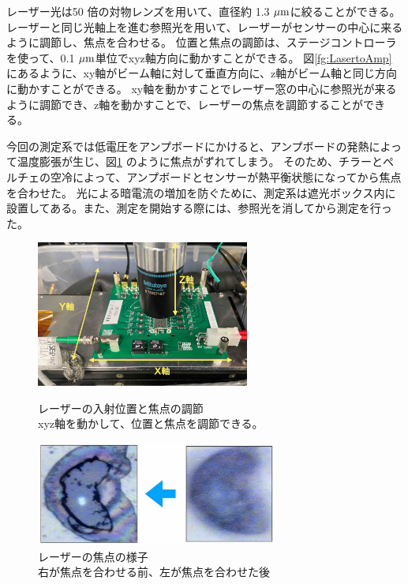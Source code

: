 レーザー光は50 倍の対物レンズを用いて、直径約 1.3 $\rm{\mu m}$に絞ることができる。
レーザーと同じ光軸上を進む参照光を用いて、レーザーがセンサーの中心に来るように調節し、焦点を合わせる。
位置と焦点の調節は、ステージコントローラを使って、0.1 $\rm{\mu m}$単位でxyz軸方向に動かすことができる。
図\ref{fg:LasertoAmp} にあるように、xy軸がビーム軸に対して垂直方向に、z軸がビーム軸と同じ方向に動かすことができる。
xy軸を動かすことでレーザー窓の中心に参照光が来るように調節でき、z軸を動かすことで、レーザーの焦点を調節することができる。

今回の測定系では低電圧をアンプボードにかけると、アンプボードの発熱によって温度膨張が生じ、図\ref{fg:Focus} のように焦点がずれてしまう。
そのため、チラーとペルチェの空冷によって、アンプボードとセンサーが熱平衡状態になってから焦点を合わせた。
光による暗電流の増加を防ぐために、測定系は遮光ボックス内に設置してある。また、測定を開始する際には、参照光を消してから測定を行った。


\begin{figure}[h]
    \begin{minipage}[b]{0.5\linewidth}
        \centering
        \includegraphics[width=7cm]{fig/ch4/LasertoAmp.jpg}
        \caption[レーザーの入射位置と焦点の調節]{レーザーの入射位置と焦点の調節\\xyz軸を動かして、位置と焦点を調節できる。}
        \label{fg:LasertoAmp}
    \end{minipage}
    \begin{minipage}[b]{0.5\linewidth}
        \centering
        \includegraphics[width=8cm]{fig/ch4/Focus.jpg}
        \caption[レーザーの焦点の様子]{レーザーの焦点の様子\\右が焦点を合わせる前、左が焦点を合わせた後}
        \label{fg:Focus}
    \end{minipage}
\end{figure}


